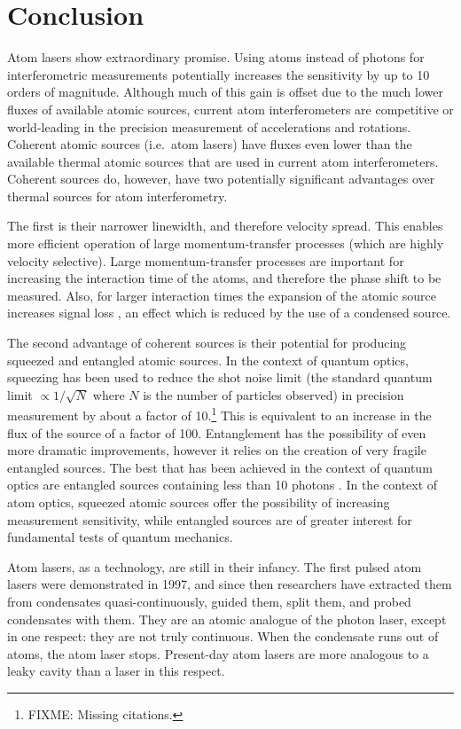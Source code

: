 \chapter{Conclusion}
\label{Conclusion}
\graphicspath{{Figures/Conclusion/}{Figures/Common/}}

Atom lasers show extraordinary promise.  Using atoms instead of photons for interferometric measurements potentially increases the sensitivity by up to 10 orders of magnitude.  Although much of this gain is offset due to the much lower fluxes of available atomic sources, current atom interferometers are competitive or world-leading in the precision measurement of accelerations and rotations.  Coherent atomic sources (i.e.\ atom lasers) have fluxes even lower than the available thermal atomic sources that are used in current atom interferometers.  Coherent sources do, however, have two potentially significant advantages over thermal sources for atom interferometry.

The first is their narrower linewidth, and therefore velocity spread.  This enables more efficient operation of large momentum-transfer processes (which are highly velocity selective).  Large momentum-transfer processes are important for increasing the interaction time of the atoms, and therefore the phase shift to be measured.  Also, for larger interaction times the expansion of the atomic source increases signal loss \citep{Dimopoulos:2007uq}, an effect which is reduced by the use of a condensed source.

The second advantage of coherent sources is their potential for producing squeezed and entangled atomic sources.  In the context of quantum optics, squeezing has been used to reduce the shot noise limit (the standard quantum limit $\propto 1/\sqrt{N}$ where $N$ is the number of particles observed) in precision measurement by about a factor of 10.\footnote{FIXME: Missing citations.}  This is equivalent to an increase in the flux of the source of a factor of 100.  Entanglement has the possibility of even more dramatic improvements, however it relies on the creation of very fragile entangled sources.  The best that has been achieved in the context of quantum optics are entangled sources containing less than 10 photons \citep{Leibfried:2004}.  In the context of atom optics, squeezed atomic sources offer the possibility of increasing measurement sensitivity, while entangled sources are of greater interest for fundamental tests of quantum mechanics.

Atom lasers, as a technology, are still in their infancy.  The first pulsed atom lasers were demonstrated in 1997, and since then researchers have extracted them from condensates quasi-continuously, guided them, split them, and probed condensates with them.  They are an atomic analogue of the photon laser, except in one respect: they are not truly continuous.  When the condensate runs out of atoms, the atom laser stops.  Present-day atom lasers are more analogous to a leaky cavity than a laser in this respect.  

